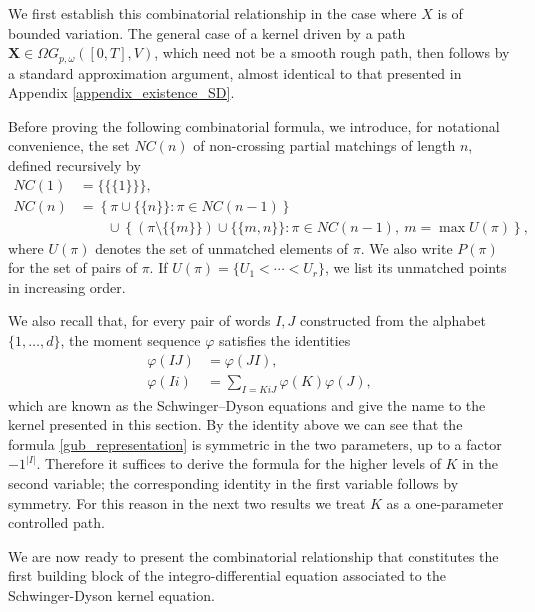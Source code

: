 \documentclass{article}%
\begin{document}
We first establish this combinatorial relationship in the case where $X$ is of bounded variation. The general case of a kernel driven by a path $\mathbf{X} \in \Omega G_{p,\omega}([0,T],V)$, which need not be a smooth rough path, then follows by a standard approximation argument, almost identical to that presented in Appendix \ref{appendix_existence_SD}.\newline

Before proving the following combinatorial formula, we introduce, for notational convenience, the set $NC(n)$ of non-crossing partial matchings of length $n$, defined recursively by
\begin{align*}
NC(1) &= \bigl\{\{\{1\}\}\bigr\},\\
NC(n) &= \left\{ \pi \cup \{\{n\}\} : \pi \in NC(n-1) \right\} \\
&\qquad \cup
\left\{ (\pi \setminus \{\{m\}\}) \cup \{\{m,n\}\} : \pi \in NC(n-1),\ m = \max U(\pi) \right\},
\end{align*}
where \(U(\pi)\) denotes the set of unmatched elements of \(\pi\). We also write \(P(\pi)\) for the set of pairs of \(\pi\). If \(U(\pi)=\{U_1<\cdots<U_r\}\), we list its unmatched points in increasing order.


We also recall \cite[Lemma 5.4.7, Remark 5.4.8]{anderson2010introduction} that, for every pair of words $I,J$ constructed from the alphabet $\{1,\dots,d\}$, the moment sequence $\varphi$ satisfies the identities
\begin{align}
\varphi(IJ) &= \varphi(JI), \nonumber\\
\varphi(Ii) &= \sum_{I = K i J} \varphi(K)\varphi(J), \label{SD_prop2}
\end{align}
which are known as the Schwinger–Dyson equations and give the name to the kernel presented in this section.
By the identity above we can see that the formula \eqref{gub_representation} is symmetric in the two parameters, up to a factor  $-1^{|I|}$. Therefore it suffices to derive the formula for the higher levels of $K$ in the second variable; the corresponding identity in the first variable follows by symmetry. For this reason in the next two results we treat $K$ as a one-parameter controlled path.

We are now ready to present the combinatorial relationship that constitutes the first building block of the integro-differential equation associated to the Schwinger-Dyson kernel equation.
\end{document}
